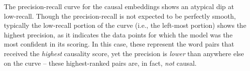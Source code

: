 




The precision-recall curve for the causal embeddings shows an atypical dip at low-recall.  Though the precision-recall is not expected to be perfectly smooth, typically the low-recall portion of the curve (i.e., the left-most portion) shows the highest precision, as it indicates the data points for which the model was the most confident in its scoring.  In this case, these represent the word pairs that received the \textit{highest} causality score, yet the precision is \textit{lower} than anywhere else on the curve -- these highest-ranked pairs are, in fact, \textit{not} causal.  


